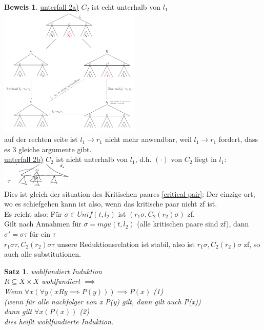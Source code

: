 \documentclass{article}
\newtheorem{satz}{Satz}
\theoremstyle{definition}
\newtheorem{beweis}{Beweis}[section]
\begin{document}
\begin{beweis}
	\underline{unterfall 2a)} $C_2$ ist echt unterhalb von $l_1$\\
	\includegraphics[width=256px]{images/unterfall2a.png}\\
	auf der rechten seite ist $l_1\to r_1$ nicht mehr anwendbar, weil $l_1\to r_1$ fordert, dass es 3 gleiche argumente gibt.\\
	\underline{unterfall 2b)} $C_2$ ist nicht unterhalb von $l_1$, d.h. $(\cdot)$ von $C_2$ liegt in $l_1$:\\
	\includegraphics[width=128px]{images/unterfall2b.png}\\
	Dies ist gleich der situation des Kritischen paares \ref{critical pair}: Der einzige ort, wo es schiefgehen kann ist also, wenn das kritische paar nicht zf ist.\\
	Es reicht also: Für $\sigma\in Unif(t,l_2)$ ist $(r_1\sigma, C_2(r_2)\sigma)$ zf.\\
	Gilt nach Annahmen für $\sigma =mgu(t,l_2)$ (alle kritischen paare sind zf), dann $\sigma' =\sigma\tau$ für ein $\tau$\\
	$r_1\sigma\tau, C_2(r_2)\sigma \tau$ unsere Reduktionsrelation ist stabil, also ist $r_1\sigma, C_2(r_2)\sigma$ zf, so auch alle substitutionen.\\
	\end{beweis}
	\begin{satz} wohlfundiert Induktion\\
	$R\subseteq X\times X$ wohlfundiert $\implies$\\
	Wenn $\forall x (\forall y (xRy\implies P(y)))\implies P(x)$ (1)\\
	(wenn für alle nachfolger von x P(y) gilt, dann gilt auch P(x))\\
	dann gilt $\forall x(P(x))$ (2)\\
	dies heißt wohlfundierte Induktion.\\
	\end{satz}
\end{document}
